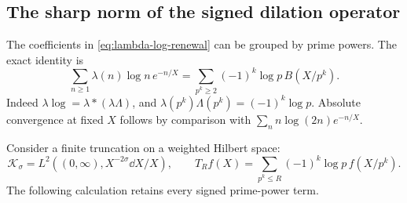 \subsection{The sharp norm of the signed dilation operator}
\label{ssec:renewal-norm}

The coefficients in \eqref{eq:lambda-log-renewal} can be grouped by
prime powers. The exact identity is
\begin{equation}\label{eq:prime-renewal-full}
 \sum_{n\ge1}\lambda(n)\log n\,e^{-n/X}
 =\sum_{p^k\ge2}(-1)^k\log p\,B(X/p^k).
\end{equation}
Indeed $\lambda\log=\lambda*(\lambda\Lambda)$, and
$\lambda(p^k)\Lambda(p^k)=(-1)^k\log p$. Absolute convergence
at fixed $X$ follows by comparison with
$\sum_n n\log(2n)e^{-n/X}$.

Consider a finite truncation on a weighted Hilbert space:
\[
 \mathcal K_\sigma=L^2((0,\infty),X^{-2\sigma}\dd X/X),\qquad
 T_R f(X)=\sum_{p^k\le R}(-1)^k\log p\,f(X/p^k).
\]
The following calculation retains every signed prime-power term.

